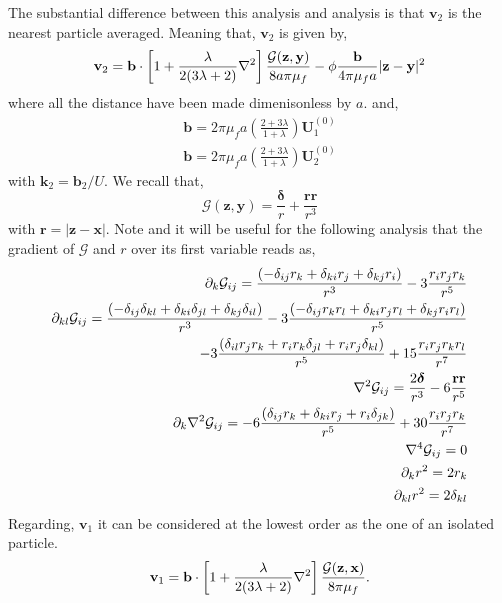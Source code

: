 The substantial difference between this analysis and \citet{kim2013microhydrodynamics} analysis is that $\textbf{v}_2$ is the nearest particle averaged.
Meaning that, $\textbf{v}_2$ is given by, 
\begin{equation}
    \textbf{v}_2 = 
    \textbf{b} \cdot \left[
        1
        + \frac{\lambda}{2(3\lambda +2)}\mathbf{\nabla}^2
    \right]\frac{\mathcal{G}(\textbf{z},\textbf{y})}{8a\pi\mu_f}
    - \phi \frac{\textbf{b}}{4 \pi \mu_f a} |\textbf{z} - \textbf{y}|^2 
\end{equation}
where all the distance have been made dimenisonless by $a$. 
and, 
\begin{align}
    \textbf{b} = 2 \pi \mu_f a \left(\frac{2+3\lambda}{1+\lambda}\right) \textbf{U}_1^{(0)}\\
    \textbf{b} = 2 \pi \mu_f a \left(\frac{2+3\lambda}{1+\lambda}\right) \textbf{U}_2^{(0)}
\end{align}
with $\textbf{k}_2 = \textbf{b}_2/U$. 
We recall that, 
\begin{equation}
    \mathcal{G}(\textbf{z},\textbf{y})
    = \frac{\bm\delta}{r}+\frac{\textbf{rr}}{r^3}
\end{equation}
with $\textbf{r} = |\textbf{z} - \textbf{x}|$. 
Note and it will be useful for the following analysis that the gradient of $\mathcal{G}$ and $r$ over its first variable reads as, 
\begin{align}
    \partial_k \mathcal{G}_{ij}
    = 
    \frac{( - \delta_{ij}r_k+ \delta_{ki}r_j +\delta_{kj}r_i)}{r^3}
    - 3\frac{r_ir_jr_k}{r^5}\\
    \partial_{kl} \mathcal{G}_{ij}
    = 
    \frac{( - \delta_{ij}\delta_{kl}+ \delta_{ki}\delta_{jl} +\delta_{kj}\delta_{il})}{r^3}
    - 3\frac{( - \delta_{ij}r_kr_l+ \delta_{ki}r_jr_l +\delta_{kj}r_ir_l)}{r^5}\\
    - 3\frac{(\delta_{il}r_jr_k + r_ir_k \delta_{jl} + r_ir_j\delta_{kl})}{r^5}
    + 15\frac{r_ir_jr_kr_l}{r^7}
    \\
    \mathbf{\nabla}^2 \mathcal{G}_{ij}
    = 
    \frac{2 \bm\delta}{r^3}
    - 6\frac{\textbf{rr}}{r^5}\\
    \partial_k \mathbf{\nabla}^2 \mathcal{G}_{ij}
    = 
    - 6\frac{(\delta_{ij} r_k + \delta_{ki} r_j+ r_i \delta_{jk})}{r^5}
    + 30\frac{r_ir_jr_k}{r^7}
    \\
    \mathbf{\nabla}^4 \mathcal{G}_{ij}
    = 
   0
    \\
    \partial_k r^2 = 2 r_k\\
    \partial_{kl} r^2 = 2 \delta_{kl}
\end{align}
Regarding, $\textbf{v}_1$ it can be considered at the lowest order as the one of an isolated particle. 
\begin{equation}
    \textbf{v}_1 = 
    \textbf{b} \cdot \left[
        1
        + \frac{\lambda}{2(3\lambda +2)}\mathbf{\nabla}^2
    \right]\frac{\mathcal{G}(\textbf{z},\textbf{x})}{8\pi\mu_f}. 
\end{equation}

